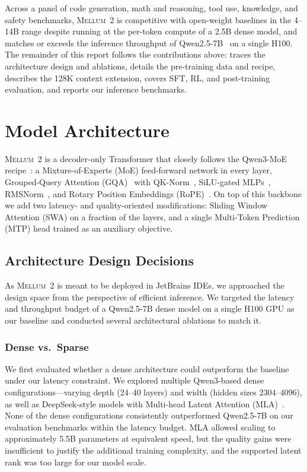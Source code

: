 \documentclass[11pt,a4paper]{article}
\newcommand{\modelname}{\textsc{Mellum~2}\xspace}
\begin{document}
Across a panel of code generation, math and reasoning, tool use, knowledge,
and safety benchmarks, \modelname is competitive with open-weight baselines
in the 4--14B range despite running at the per-token compute of a 2.5B dense
model, and matches or exceeds the inference throughput of Qwen2.5-7B~\cite{qwen2.5} on a
single H100. The remainder of this report follows the contributions above:
 traces the architecture design and ablations,
 details the pre-training data and recipe,
 describes the 128K context extension,
 covers SFT, RL, and post-training evaluation, and
 reports our inference benchmarks.

\section{Model Architecture}
\label{sec:architecture}

\modelname is a decoder-only Transformer that closely follows the Qwen3-MoE
recipe~\cite{yang2025qwen3}: a Mixture-of-Experts (MoE) feed-forward network in
every layer, Grouped-Query Attention (GQA)~\cite{ainslie2023gqa} with QK-Norm~\cite{henry2020qknorm},
SiLU-gated MLPs~\cite{shazeer2020glu}, RMSNorm~\cite{zhang2019rmsnorm}, and Rotary Position Embeddings (RoPE)~\cite{su2024roformer}.
On top of this backbone we add two latency- and quality-oriented modifications:
Sliding Window Attention (SWA) on a fraction of the layers, and a single
Multi-Token Prediction (MTP) head trained as an auxiliary objective.

\subsection{Architecture Design Decisions}
\label{sec:arch-decisions}

As \modelname is meant to be deployed in JetBrains IDEs, we approached the design space
from the perspective of efficient inference. We targeted the latency and throughput 
budget of a Qwen2.5-7B dense model on a single H100 GPU as our baseline and conducted
several architectural ablations to match it.

\subsubsection{Dense vs.\ Sparse}

We first evaluated whether a dense architecture could outperform the baseline
under our latency constraint. We explored multiple Qwen3-based dense
configurations---varying depth (24--40 layers) and width (hidden sizes 2304--4096),
as well as DeepSeek-style models with Multi-head Latent Attention
(MLA)~\cite{deepseekai2024deepseekv2}. None of the dense configurations
consistently outperformed Qwen2.5-7B on our evaluation benchmarks within the
latency budget. MLA allowed scaling to approximately 5.5B parameters at
equivalent speed, but the quality gains were insufficient to justify the
additional training complexity, and the supported latent rank was too large
for our model scale.
\end{document}
